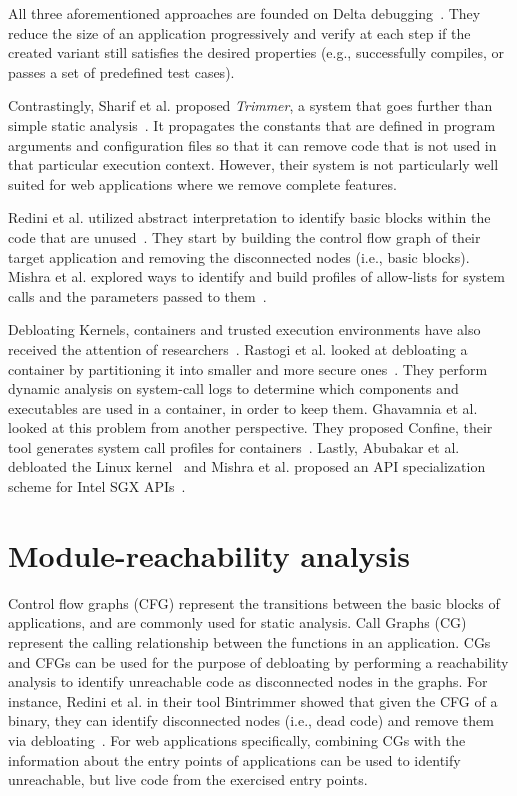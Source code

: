 All three aforementioned approaches are founded on Delta debugging~\cite{zeller2002Delta}.
They reduce the size of an application progressively and verify at each step if the created variant still satisfies the desired properties (e.g., successfully compiles, or passes a set of predefined test cases).

Contrastingly, Sharif et al. proposed \textit{Trimmer}, a system that goes further than simple static analysis~\cite{sharif2018Trimmer}.
It propagates the constants that are defined in program arguments and configuration files so that it can remove code that is not used in that particular execution context.
However, their system is not particularly well suited for web applications where we remove complete features.

Redini et al. utilized abstract interpretation to identify basic blocks within the code that are unused~\cite{redini2019b}. 
They start by building the control flow graph of their target application and removing the disconnected nodes (i.e., basic blocks). 
Mishra et al. explored ways to identify and build profiles of allow-lists for system calls and the parameters passed to them~\cite{mishra2018shredder,mishra2020saffire}. 

Debloating Kernels, containers and trusted execution environments have also received the attention of researchers~\cite{abubakar2021shard,mishra2021sgxpecial}. 
Rastogi et al. looked at debloating a container by partitioning it into smaller and more secure ones~\cite{rastogi2017Cimplifier}. They perform dynamic analysis on system-call logs to determine which components and executables are used in a container, in order to keep them. 
Ghavamnia et al. looked at this problem from another perspective. 
They proposed Confine, their tool generates system call profiles for containers~\cite{259711}.
Lastly, Abubakar et al. debloated the Linux kernel~\cite{abubakar2021shard} and Mishra et al. proposed an API specialization scheme for Intel SGX APIs~\cite{mishra2021sgxpecial}.

\section{Module-reachability analysis}

Control flow graphs (CFG) represent the transitions between the basic blocks of applications, and are commonly used for static analysis. 
Call Graphs (CG) represent the calling relationship between the functions in an application. 
CGs and CFGs can be used for the purpose of debloating by performing a reachability analysis to identify unreachable code as disconnected nodes in the graphs. 
For instance, Redini et al. in their tool Bintrimmer showed that given the CFG of a binary, they can identify disconnected nodes (i.e., dead code) and remove them via debloating~\cite{redini2019b}. 
For web applications specifically, combining CGs with the information about the entry points of applications can be used to identify unreachable, but live code from the exercised entry points. 

